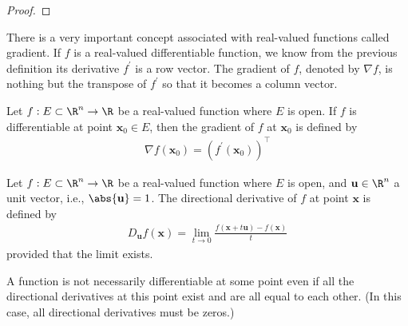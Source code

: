 \documentclass[thmcnt=section, 12pt]{elegantbook}
\begin{document}
\begin{proof}
\end{proof}


\par There is a very important concept associated with real-valued functions called gradient. If $f$ is a real-valued differentiable function, we know from the previous definition its derivative $f^\prime$ is a row vector. The gradient of $f$, denoted by $\nabla f$, is nothing but the transpose of $f^\prime$ so that it becomes a column vector.

\begin{definition}[Gradient]
    Let $f: E \subset \R^n \to \R$ be a real-valued function where $E$ is open. If $f$ is differentiable at point $\mathbf{x}_0 \in E$, then the gradient of $f$ at $\mathbf{x}_0$ is defined by 
    \begin{align*}
        \nabla f (\mathbf{x}_0) = \left(f^\prime(\mathbf{x}_0)\right)^\top
    \end{align*}
\end{definition}


\begin{definition}
    Let $f: E \subset \R^n \to \R$ be a real-valued function where $E$ is open, and $\mathbf{u} \in \R^n$ a unit vector, i.e., $\abs{\mathbf{u}} = 1$. The directional derivative of $f$ at point $\mathbf{x}$ is defined by 
    \begin{align*}
        D_{\mathbf{u}}f (\mathbf{x})
        = \lim_{t \to 0} \frac{f(\mathbf{x} + t \mathbf{u}) - f(\mathbf{x})}{t}
    \end{align*}
    provided that the limit exists.
\end{definition}


\par A function is not necessarily differentiable at some point even if all the directional derivatives at this point exist and are all equal to each other. (In this case, all directional derivatives must be zeros.)
\end{document}
